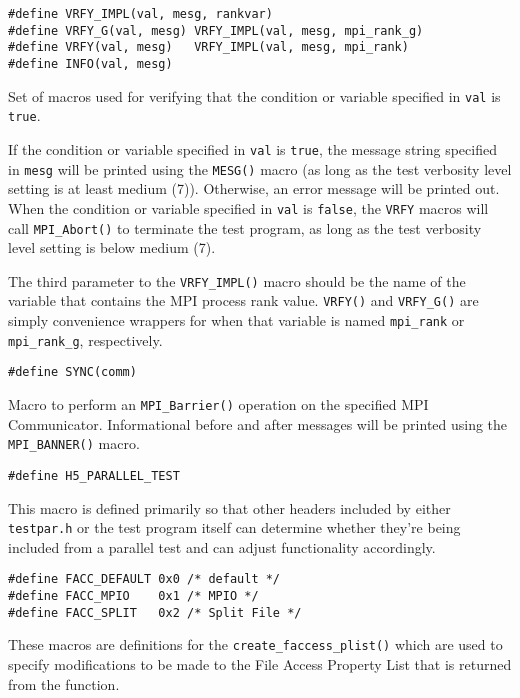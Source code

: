 \documentclass[../HDF5_RFC.tex]{subfiles}
\begin{document}
\begin{verbatim}
#define VRFY_IMPL(val, mesg, rankvar)
#define VRFY_G(val, mesg) VRFY_IMPL(val, mesg, mpi_rank_g)
#define VRFY(val, mesg)   VRFY_IMPL(val, mesg, mpi_rank)
#define INFO(val, mesg)
\end{verbatim}

Set of macros used for verifying that the condition or variable specified in \texttt{val} is \texttt{true}.

If the condition or variable specified in \texttt{val} is \texttt{true}, the message string specified in
\texttt{mesg} will be printed using the \texttt{MESG()} macro (as long as the test verbosity level setting
is at least medium (7)). Otherwise, an error message will be printed out. When the condition or variable specified in \texttt{val} is \texttt{false}, the \texttt{VRFY} macros will call \texttt{MPI\_Abort()} to
terminate the test program, as long as the test verbosity level setting is below medium (7).

The third parameter to the \texttt{VRFY\_IMPL()} macro should be the name of the variable that contains
the MPI process rank value. \texttt{VRFY()} and \texttt{VRFY\_G()} are simply convenience wrappers for
when that variable is named \texttt{mpi\_rank} or \texttt{mpi\_rank\_g}, respectively.

\begin{verbatim}
#define SYNC(comm)
\end{verbatim}

Macro to perform an \texttt{MPI\_Barrier()} operation on the specified MPI Communicator. Informational
before and after messages will be printed using the \texttt{MPI\_BANNER()} macro.

\begin{verbatim}
#define H5_PARALLEL_TEST
\end{verbatim}

This macro is defined primarily so that other headers included by either \texttt{testpar.h}
or the test program itself can determine whether they're being included from a parallel test
and can adjust functionality accordingly.

\begin{verbatim}
#define FACC_DEFAULT 0x0 /* default */
#define FACC_MPIO    0x1 /* MPIO */
#define FACC_SPLIT   0x2 /* Split File */
\end{verbatim}

These macros are definitions for the \texttt{create\_faccess\_plist()} which are used to specify
modifications to be made to the File Access Property List that is returned from the function.
\end{document}

